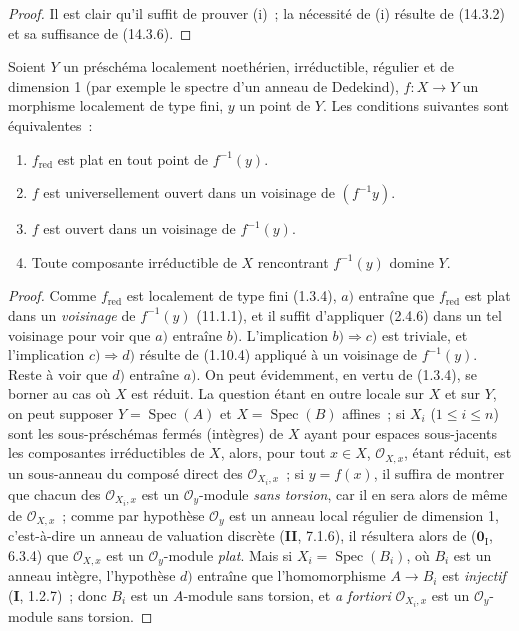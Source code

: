 \begin{proof}
Il est clair qu'il suffit de prouver (i)~; la nécessité de (i) résulte de (14.3.2)
et sa suffisance de (14.3.6).
\end{proof}

\begin{proposition}[14.3.8]
Soient $Y$ un préschéma localement noethérien, irréductible, régulier et de
dimension 1 (par exemple le spectre d'un anneau de Dedekind), $f:X\to Y$ un
morphisme localement de type fini, $y$ un point de $Y$. Les conditions suivantes
sont équivalentes~:
\begin{enumerate}[label=\emph{\alph*)}]
  \item $f_{\mathrm{red}}$ est plat en tout point de $f^{-1}(y)$.
  \item $f$ est universellement ouvert dans un voisinage de $(f^{-1}y)$.
  \item $f$ est ouvert dans un voisinage de $f^{-1}(y)$.
  \item Toute composante irréductible de $X$ rencontrant $f^{-1}(y)$ domine $Y$.
\end{enumerate}
\end{proposition}

\begin{proof}
Comme $f_{\mathrm{red}}$ est localement de type fini (1.3.4), $a)$ entraîne que
$f_{\mathrm{red}}$ est plat dans un \emph{voisinage} de $f^{-1}(y)$ (11.1.1), et il
suffit d'appliquer (2.4.6) dans un tel voisinage pour voir que $a)$ entraîne $b)$.
L'implication $b)\Rightarrow c)$ est triviale, et l'implication
$c)\Rightarrow d)$ résulte de (1.10.4) appliqué à un voisinage de $f^{-1}(y)$.
Reste à voir que $d)$ entraîne $a)$. On peut évidemment, en vertu de (1.3.4), se
borner au cas où $X$ est réduit. La question étant en outre locale sur $X$ et sur
$Y$, on peut supposer $Y=\operatorname{Spec}(A)$ et
$X=\operatorname{Spec}(B)$
affines~; si $X_i$ ($1\leq i\leq n$) sont les sous-préschémas fermés (intègres)
de $X$ ayant pour
espaces sous-jacents les composantes irréductibles de $X$,
alors, pour tout $x\in X$, $\mathcal O_{X,x}$, étant réduit, est un sous-anneau du
composé direct des $\mathcal O_{X_i,x}$~; si $y=f(x)$, il suffira de montrer que
chacun des $\mathcal O_{X_i,x}$ est un $\mathcal O_y$-module \emph{sans torsion},
car il en sera alors de même de $\mathcal O_{X,x}$~; comme par hypothèse
$\mathcal O_y$ est un anneau local régulier de dimension 1, c'est-à-dire un anneau
de valuation discrète (\textbf{II}, 7.1.6), il résultera alors de
($\mathbf{0}_{\mathrm I}$, 6.3.4) que $\mathcal O_{X,x}$ est un
$\mathcal O_y$-module \emph{plat}. Mais si $X_i=\operatorname{Spec}(B_i)$, où
$B_i$ est un anneau intègre, l'hypothèse $d)$ entraîne que l'homomorphisme
$A\to B_i$ est \emph{injectif} (\textbf{I}, 1.2.7)~; donc $B_i$ est un $A$-module sans
torsion, et \emph{a fortiori} $\mathcal O_{X_i,x}$ est un $\mathcal O_y$-module
sans torsion.
\end{proof}

